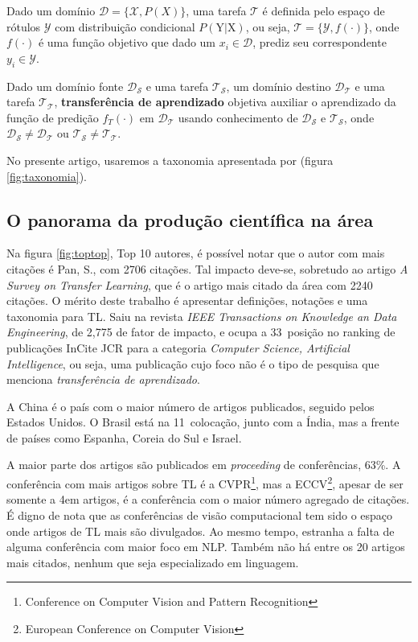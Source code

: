 \documentclass[sigconf]{acmart}
\begin{document}
    Dado um domínio $\mathcal{D}=\{\mathcal{X}, P(X)\}$, uma tarefa $\mathcal{T}$ é definida pelo espaço de rótulos $\mathcal{Y}$ com distribuição condicional $P(\mathrm{Y}|\mathrm{X})$, ou seja, $\mathcal{T}=\{\mathcal{Y}, f(\cdot)\}$, onde $f(\cdot)$ é uma função objetivo que dado um $x_i \in \mathcal{D}$, prediz seu correspondente $y_i \in \mathcal{Y}$. 

    Dado um domínio fonte $\mathcal{D_S}$ e uma tarefa $\mathcal{T_S}$, um domínio destino $\mathcal{D_T}$ e uma tarefa $\mathcal{T_T}$, \textbf{transferência de aprendizado} objetiva auxiliar o aprendizado da função de predição $f_T(\cdot)$ em  $\mathcal{D_T}$ usando conhecimento de $\mathcal{D_S}$ e $\mathcal{T_S}$, onde $\mathcal{D_S}\neq\mathcal{D_T}$ ou $\mathcal{T_S}\neq\mathcal{T_T}$.

    No presente artigo, usaremos a taxonomia apresentada por \cite{PanYang} (figura \ref{fig:taxonomia}). 
    \subsection{O panorama da produção científica na área}\label{sec:panorama}
  Na figura \ref{fig:toptop}, Top 10 autores, é possível notar que o autor com mais citações é Pan, S., com 2706 citações. Tal impacto deve-se, sobretudo ao artigo \emph{A Survey on Transfer Learning}, que é o artigo mais citado da área com 2240 citações. O mérito deste trabalho é apresentar definições, notações e uma taxonomia para TL. Saiu na revista \emph{IEEE Transactions on Knowledge an Data Engineering}, de 2,775 de fator de impacto, e ocupa a 33\textordfeminine ~posição no ranking de publicações InCite JCR para a categoria \emph{Computer Science, Artificial Intelligence}, ou seja, uma publicação cujo foco não é o tipo de pesquisa que menciona \emph{transferência de aprendizado}. 

  A China é o país com o maior número de artigos publicados, seguido pelos Estados Unidos. O Brasil está na 11\textordfeminine ~colocação, junto com a Índia, mas a frente de países como Espanha, Coreia do Sul e Israel.

  A maior parte dos artigos são publicados em \emph{proceeding} de conferências, 63\%. A conferência com mais artigos sobre TL é a CVPR\footnote{Conference on Computer Vision and Pattern Recognition}, mas a ECCV\footnote{European Conference on Computer Vision}, apesar de ser somente a 4\textordfeminine em artigos,  é a conferência com o maior número agregado de citações. É digno de nota que as conferências de visão computacional tem sido o espaço onde artigos de TL mais são divulgados. Ao mesmo tempo, estranha a falta de alguma conferência com maior foco em NLP. Também não há entre os 20 artigos mais citados, nenhum que seja especializado em linguagem.
\end{document}
